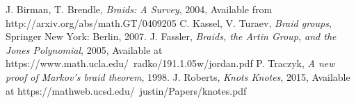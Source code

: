 \begin{thebibliography}{1}
 J. Birman, T. Brendle, \emph{Braids: A Survey}, 2004, Available from http://arxiv.org/abs/math.GT/0409205
\bibitem[KT]{} C. Kassel, V. Turaev, \emph{Braid groups}, Springer New York: Berlin, 2007.
\bibitem[Fas]{} J. Fassler, \emph{Braids, the Artin Group, and the Jones Polynomial}, 2005, Available at https://www.math.ucla.edu/~radko/191.1.05w/jordan.pdf
\bibitem[Tra]{} P. Traczyk, \emph{A new proof of Markov's braid theorem}, 1998.
\bibitem[Rob]{} J. Roberts, \emph{Knots Knotes}, 2015, Available at https://mathweb.ucsd.edu/~justin/Papers/knotes.pdf    
\end{thebibliography}